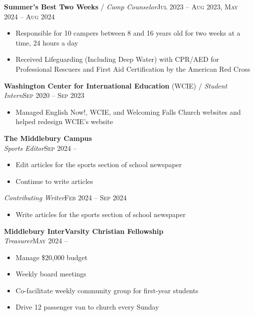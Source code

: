 \documentclass[12pt, a4paper]{article}
\begin{document}
\textbf{Summer's Best Two Weeks} / \textit{Camp Counselor}\hfill\textsc{Jul 2023 -- Aug 2023, May 2024 -- Aug 2024}\\
\begin{itemize}
    \vspace{-8mm}
    \item Responsible for 10 campers between 8 and 16 years old for two weeks at a time, 24 hours a day
    \item Received Lifeguarding (Including Deep Water) with CPR/AED for Professional Rescuers and First Aid Certification by the American Red Cross
\end{itemize}

\textbf{Washington Center for International Education} (WCIE) / \textit{Student Intern}\hfill\textsc{Sep 2020 -- Sep 2023}\\
\begin{itemize}
    \vspace{-8mm}
    \item Managed English Now!, WCIE, and Welcoming Falls Church websites and helped redesign WCIE's website
\end{itemize}


\textbf{The Middlebury Campus}\\
\textit{Sports Editor}\hfill\textsc{Sep 2024 --}\\
\begin{itemize}
    \vspace{-8mm}
    \item Edit articles for the sports section of school newspaper
    \item Continue to write articles
\end{itemize}
\vspace{-4mm}
\textit{Contributing Writer}\hfill\textsc{Feb 2024 -- Sep 2024}\\
\begin{itemize}
    \vspace{-8mm}
    \item Write articles for the sports section of school newspaper
\end{itemize}

\textbf{Middlebury InterVarsity Christian Fellowship}\\
\textit{Treasurer}\hfill\textsc{May 2024 --}\\
\begin{itemize}
    \vspace{-8mm}
    \item Manage \$20,000 budget
    \item Weekly board meetings
    \item Co-facilitate weekly community group for first-year students
    \item Drive 12 passenger van to church every Sunday
\end{itemize}
\end{document}
